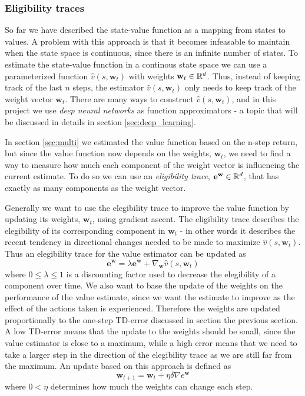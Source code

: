 \documentclass[11pt]{article}
\begin{document}
\subsubsection{Eligibility traces}\label{sec:et}

So far we have described the state-value function as a mapping from states to values.
A problem with this approach is that it becomes infeasable to maintain 
when the state space is continuous, since there is an infinite number of states.
To estimate the state-value function in a continous state space we can use a
parameterized function $\hat{v}(s, \mathbf{w}_t)$ with weights $\mathbf{w}_t \in \mathbb{R}^d$.
Thus, instead of keeping track of the last $n$ steps, the estimator $\hat{v}(s, \mathbf{w}_t)$
only needs to keep track of the weight vector $\mathbf{w}_t$.
There are many ways to construct $\hat{v}(s, \mathbf{w}_t)$, and in this project we use \textit{deep neural networks}
as function approximators - a topic that will be discussed in details in section \ref{sec:deep_learning}.

In section \ref{sec:multi} we estimated the value function based on the n-step return, but
since the value function now depends on the weights, $\mathbf{w}_t$, we need to find a way
to measure how much each component of the weight vector is influencing the
current estimate.
To do so we can use an \textit{eligibility trace}, $\mathbf{e}^{\mathbf{w}} \in \mathbb{R}^d$, that
has exactly as many components as the weight vector.

Generally we want to use the elegibility trace to improve the value function by
updating its weights, $\mathbf{w}_t$, using gradient ascent.
The eligibility trace describes the elegibility of its corresponding component in $\mathbf{w}_t$
- in other words it describes the recent tendency in directional changes needed to be made
to maximize $\hat{v}(s, \mathbf{w}_t)$.
Thus an elegibility trace for the value estimator can be updated as
\begin{equation}
    \mathbf{e}^\mathbf{w} = \lambda \mathbf{e}^\mathbf{w} + \nabla_\mathbf{w} \hat{v}(s, \mathbf{w}_t)
\end{equation}
where $0 \leq \lambda \leq 1$ is a discounting factor used to decrease the elegibility of a component
over time.
We also want to base the update of the weights on the performance of the value estimate,
since we want the estimate to improve as the effect of the actions taken is experienced.
Therefore the weights are updated proportionally to the one-step TD-error discussed in section the previous
section.
A low TD-error means that the update to the weights should be small, since the value estimator is
close to a maximum, while a high error means that we need to take a larger step
in the direction of the elegibility trace as we are still far from the maximum.
An update based on this approach is defined as
\begin{equation}
    \mathbf{w}_{t+1} = \mathbf{w}_t + \eta \delta \nabla e^\mathbf{w}
\end{equation}
where $0 < \eta$ determines how much the weights can change each step.
\end{document}
